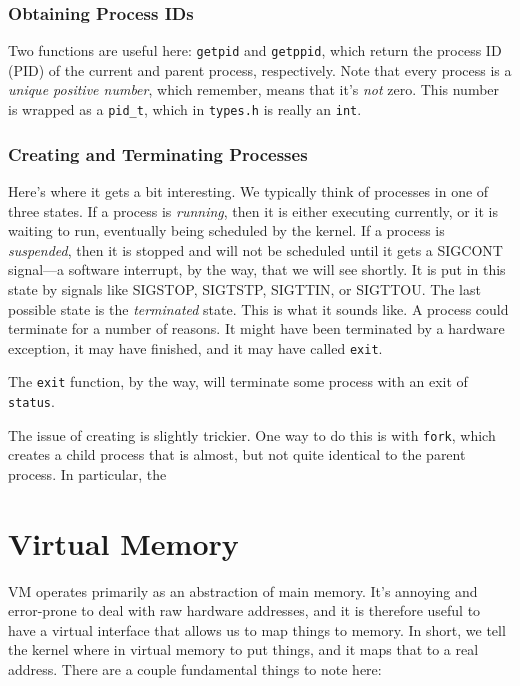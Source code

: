 \documentclass[fleqn]{article}
\begin{document}
\subsubsection{Obtaining Process IDs}

Two functions are useful here: \texttt{getpid} and \texttt{getppid}, which return the process ID (PID) of the current and parent process, respectively. Note that every process is a \textit{unique positive number}, which remember, means that it's \textit{not} zero. This number is wrapped as a \texttt{pid\_t}, which in \texttt{types.h} is really an \texttt{int}.

\subsubsection{Creating and Terminating Processes}

Here's where it gets a bit interesting. We typically think of processes in one of three states. If a process is \textit{running}, then it is either executing currently, or it is waiting to run, eventually being scheduled by the kernel. If a process is \textit{suspended}, then it is stopped and will not be scheduled until it gets a SIGCONT signal---a software interrupt, by the way, that we will see shortly. It is put in this state by signals like SIGSTOP, SIGTSTP, SIGTTIN, or SIGTTOU. The last possible state is the \textit{terminated} state. This is what it sounds like. A process could terminate for a number of reasons. It might have been terminated by a hardware exception, it may have finished, and it may have called \texttt{exit}.

The \texttt{exit} function, by the way, will terminate some process with an exit of \texttt{status}.

The issue of creating is slightly trickier. One way to do this is with \texttt{fork}, which creates a child process that is almost, but not quite identical to the parent process. In particular, the 















\section{Virtual Memory}

VM operates primarily as an abstraction of main memory. It's annoying and error-prone to deal with raw hardware addresses, and it is therefore useful to have a virtual interface that allows us to map things to memory. In short, we tell the kernel where in virtual memory to put things, and it maps that to a real address. There are a couple fundamental things to note here:
\end{document}

